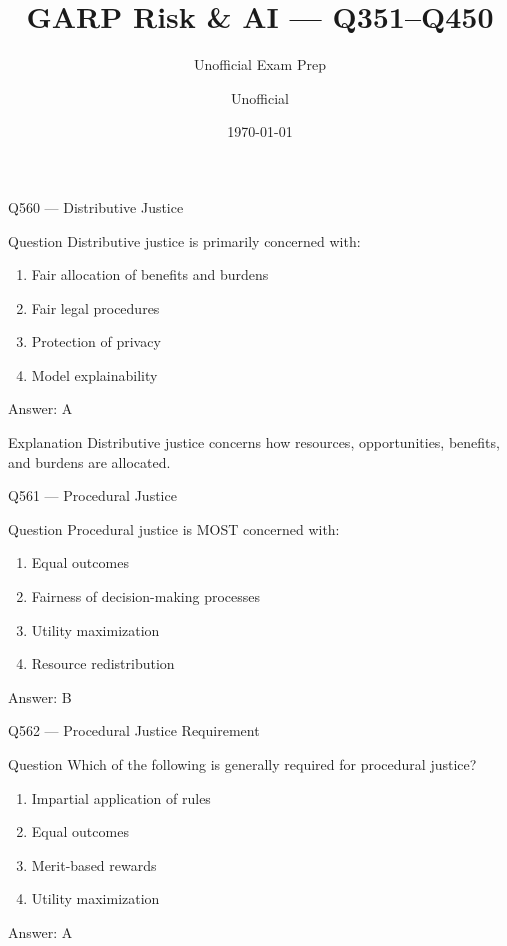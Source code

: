 \documentclass[aspectratio=169,8pt]{beamer}
\title[GARP RAI]{GARP Risk \& AI --- Q351--Q450}
\subtitle{Unofficial Exam Prep}
\author{Unofficial}
\date{\today}
\begin{document}
\begin{frame}{Q560 --- Distributive Justice}
	\begin{block}{Question}
		Distributive justice is primarily concerned with:
		\begin{enumerate}
			\item Fair allocation of benefits and burdens
			\item Fair legal procedures
			\item Protection of privacy
			\item Model explainability
		\end{enumerate}
	\end{block}
	
	\begin{exampleblock}{Answer: A}\end{exampleblock}
	
	\begin{block}{Explanation}
		Distributive justice concerns how resources, opportunities, benefits, and burdens are allocated.
	\end{block}
\end{frame}

\begin{frame}{Q561 --- Procedural Justice}
	\begin{block}{Question}
		Procedural justice is MOST concerned with:
		\begin{enumerate}
			\item Equal outcomes
			\item Fairness of decision-making processes
			\item Utility maximization
			\item Resource redistribution
		\end{enumerate}
	\end{block}
	
	\begin{exampleblock}{Answer: B}\end{exampleblock}
\end{frame}

\begin{frame}{Q562 --- Procedural Justice Requirement}
	\begin{block}{Question}
		Which of the following is generally required for procedural justice?
		\begin{enumerate}
			\item Impartial application of rules
			\item Equal outcomes
			\item Merit-based rewards
			\item Utility maximization
		\end{enumerate}
	\end{block}
	
	\begin{exampleblock}{Answer: A}\end{exampleblock}
\end{frame}
\end{document}
